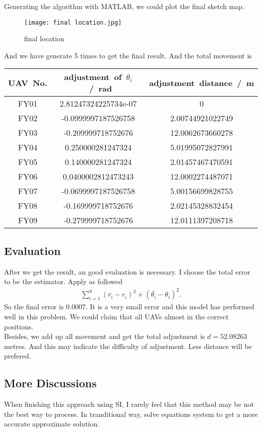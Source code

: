 \documentclass[lang=cn,a4paper,newtx]{elegantpaper}
\begin{document}
Generating the algorithm with MATLAB, we could plot the final sketch map.

\begin{figure}[htbp]
  \centering
  \texttt{[image: final location.jpg]}
  \caption{final location}
\end{figure}

And we have generate 5 times to get the final result.
And the total movement is 
\begin{center}
	\begin{tabular}{|c|c|c|}
		\hline
		\mbox{UAV No.}&\mbox{adjustment of $\theta_i$ / rad}&\mbox{adjustment distance / m}\\
		\hline
		FY01&2.81247324225734e-07&0\\
		\hline
		FY02&-0.0999997187526758&2.00744921022749\\
		\hline
		FY03&-0.209999718752676&12.0062673660278\\
		\hline
		FY04&0.250000281247324&5.01995072827991\\
		\hline
		FY05&0.140000281247324&2.01457467470591\\
		\hline
		FY06&0.0400002812473243&12.0002274487071\\
		\hline
		FY07&-0.0699997187526758&5.00156699828755\\
		\hline
		FY08&-0.169999718752676&2.02145328832454\\
		\hline
		FY09&-0.279999718752676&12.0111397208718\\
		\hline
	\end{tabular}
\end{center}

\subsection{Evaluation}
After we get the result, an good evaluation is necessary.
I choose the total error to be the estimator.
Apply as followed
\begin{align*}
  \sum_{i=1}^{9} (\bar{r_i} - r_i)^2 + (\bar{\theta_i}-\theta_i)^2.
\end{align*}
So the final error is $0.0007$.
It is a very small error and this model has performed well in this problem.
We could claim that all UAVs almost in the correct positions.\\
Besides, we add up all movement and get the total adjustment is $d=52.08263$ metres.
And this may indicate the difficulty of adjustment.
Less distance will be prefered.

\subsection{More Discussions}
When finishing this approach using SI, I rarely feel that this method may be not the best way to process.
In tranditional way, solve equations system to get a more accurate approximate solution.
\end{document}
